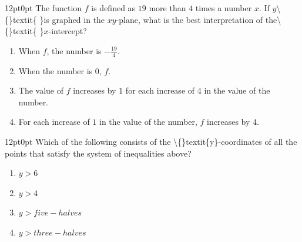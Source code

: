 \documentclass[11pt, twocolumn]{article}
\newcounter{questionnum}
\begin{document}
\vspace{6pt}\noindent
\begin{minipage}{\columnwidth}\raggedright
\noindent{}\par\vspace{8pt}
\begin{adjustwidth}{12pt}{0pt}
The function $f$ is defined as $19$ more than $4$ times a number $x$. If $y$\textbackslash\{\}textit\{ \}is graphed in the $x y$-plane, what is the best interpretation of the\textbackslash\{\}textit\{ \}$x$-intercept?
\begin{enumerate}[label=\Alph*),leftmargin=18pt,topsep=3pt,itemsep=2pt]
  \item When $f$, the number is $- \frac{19}{4}$.
  \item When the number is $0$,  $f$.
  \item The value of $f$ increases by $1$ for each increase of $4$ in the value of the number.
  \item For each increase of $1$ in the value of the number, $f$ increases by $4$.
\end{enumerate}
\end{adjustwidth}
\end{minipage}\par

\vspace{6pt}\noindent
\begin{minipage}{\columnwidth}\raggedright
\noindent{}\par\vspace{8pt}
\begin{adjustwidth}{12pt}{0pt}
Which of the following consists of the \textbackslash\{\}textit\{y\}-coordinates of all the points that satisfy the system of inequalities above?
\begin{enumerate}[label=\Alph*),leftmargin=18pt,topsep=3pt,itemsep=2pt]
  \item $y > 6$
  \item $y > 4$
  \item $y > five-halves$
  \item $y > three-halves$
\end{enumerate}
\end{adjustwidth}
\end{minipage}\par
\end{document}
